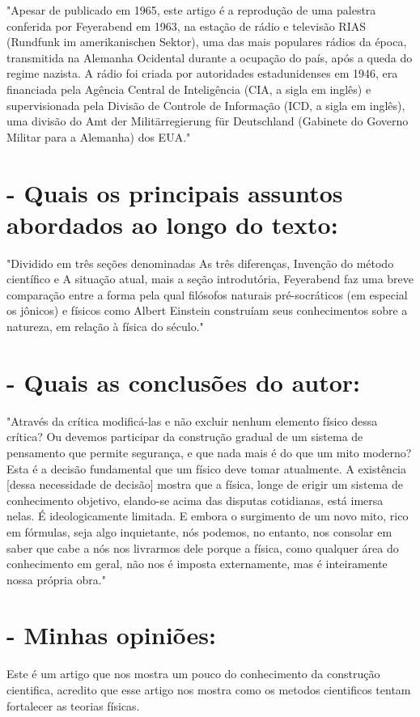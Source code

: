\documentclass [a4paper, 12pt]{article}
\begin{document}
"Apesar de publicado em 1965, este artigo é a reprodução de uma palestra conferida por Feyerabend em 1963, na estação de rádio e televisão RIAS (Rundfunk im amerikanischen Sektor), uma das mais populares rádios da época, transmitida na Alemanha Ocidental durante a ocupação do país, após a queda do regime nazista. A rádio foi criada por autoridades estadunidenses em 1946, era financiada pela Agência Central de Inteligência (CIA, a sigla em inglês) e supervisionada pela Divisão de Controle de Informação (ICD, a sigla em inglês), uma divisão do Amt der Militärregierung für Deutschland (Gabinete do Governo Militar para a Alemanha) dos EUA."

\section*{- Quais os principais assuntos abordados ao longo do texto:}

"Dividido em três seções denominadas As três diferenças, Invenção do método científico e A situação atual, mais a seção introdutória, Feyerabend faz uma breve comparação entre a forma pela qual filósofos naturais pré-socráticos (em especial os jônicos) e físicos como Albert Einstein construíam seus conhecimentos sobre a natureza, em relação à física do século." 

\section*{- Quais as conclusões do autor:}

 "Através da crítica modificá-las e não excluir nenhum
elemento físico dessa crítica? Ou devemos participar da construção gradual de um sistema 
de pensamento que permite segurança, e que nada mais é do que um mito moderno? Esta
é a decisão fundamental que um físico deve tomar atualmente. A existência [dessa
necessidade de decisão] mostra que a física, longe de erigir um sistema de conhecimento
objetivo, elando-se acima das disputas cotidianas, está imersa nelas. É ideologicamente
limitada. E embora o surgimento de um novo mito, rico em fórmulas, seja algo
inquietante, nós podemos, no entanto, nos consolar em saber que cabe a nós nos livrarmos
dele porque a física, como qualquer área do conhecimento em geral, não nos é imposta
externamente, mas é inteiramente nossa própria obra."

\section*{- Minhas opiniões:}

Este é um artigo que nos mostra um pouco do conhecimento da construção cientifica, acredito que esse artigo nos mostra como os metodos cientificos tentam fortalecer as teorias  físicas.
\end{document}
